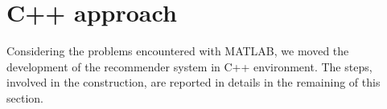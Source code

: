 \section{C++ approach}

Considering the problems encountered with MATLAB, we moved the development of the recommender system in C++ environment. The steps, involved in the construction, are reported in details in the remaining of this section.


